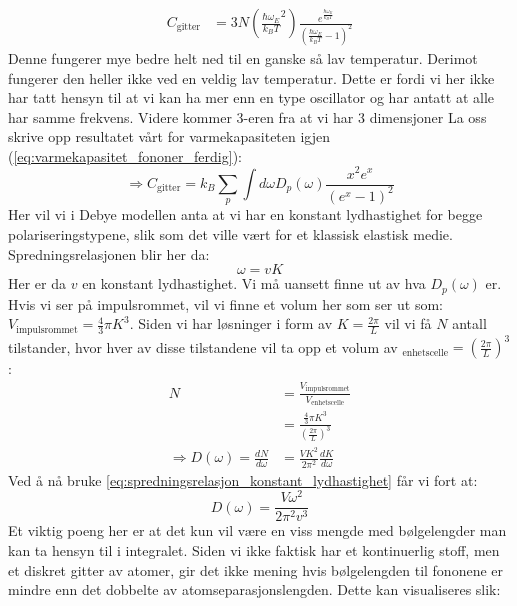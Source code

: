 \documentclass{article}
\begin{document}
\begin{align*}
    C_{\text{gitter}} &= 3N \left(\frac{\hbar \omega_E}{k_B T}^2\right) \frac{e^{\frac{\hbar \omega_E}{k_B T}}}{\left(\frac{\hbar \omega_E}{k_B T} - 1\right)^2}
\end{align*}
Denne fungerer mye bedre helt ned til en ganske så lav temperatur. Derimot fungerer den heller ikke ved en veldig lav temperatur. Dette er fordi vi her ikke har tatt hensyn til at vi kan ha mer enn en type oscillator og har antatt at alle har samme frekvens. Videre kommer 3-eren fra at vi har 3 dimensjoner
La oss skrive opp resultatet vårt for varmekapasiteten igjen (\ref{eq:varmekapasitet_fononer_ferdig}):
\begin{equation*}
    \Rightarrow C_{\text{gitter}} = k_B \sum_p \int d\omega D_p(\omega) \frac{x^2e^x}{\left(e^x-1\right)^2}
\end{equation*}
Her vil vi i Debye modellen anta  at vi har en konstant lydhastighet for begge polariseringstypene, slik som det ville vært for et klassisk elastisk medie. Spredningsrelasjonen blir her da:
\begin{equation}
\label{eq:spredningsrelasjon_konstant_lydhastighet}
    \omega = v K
\end{equation}
Her er da $v$ en konstant lydhastighet. Vi må uansett finne ut av hva $D_p(\omega)$ er.
Hvis vi ser på impulsrommet, vil vi finne et volum her som ser ut som: $V_{\text{impulsrommet}} = \frac{4}{3} \pi K^3$. Siden vi har løsninger i form av $K = \frac{2\pi}{L}$ vil vi få $N$ antall tilstander, hvor hver av disse tilstandene vil ta opp et volum av $_{\text{enhetscelle}} = \left(\frac{2 \pi}{L}\right)^3$:
\begin{align}
    N &= \frac{V_{\text{impulsrommet}}}{V_{\text{enhetscelle}}}\\
    &= \frac{\frac{4}{3} \pi K^3}{\left(\frac{2 \pi}{L}\right)^3} \\
\Rightarrow D(\omega) = \frac{dN}{d \omega} &=\frac{V K^2}{ 2 \pi^2} \frac{dK}{d\omega}
\label{eq:antall_tilstander_i_debye}
\end{align}
Ved å nå bruke \ref{eq:spredningsrelasjon_konstant_lydhastighet} får vi fort at:
\begin{equation}
    D(\omega) = \frac{V \omega^2}{2 \pi^2 v^3}
\end{equation}
Et viktig poeng her er at det kun vil være en viss mengde med bølgelengder man kan ta hensyn til i integralet. Siden vi ikke faktisk har et kontinuerlig stoff, men et diskret gitter av atomer, gir det ikke mening hvis bølgelengden til fononene er mindre enn det dobbelte av atomseparasjonslengden. Dette kan visualiseres slik:
\end{document}
